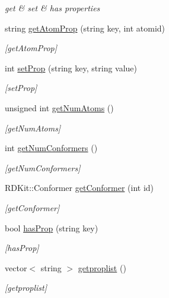 \begin{DoxyCompactItemize}
\begin{DoxyCompactList}\small\item\em get \& set \& has properties \end{DoxyCompactList}\item 
string \mbox{\hyperlink{class_molecule_acb057213561817b5e78a1e5e5845ae8f}{get\+Atom\+Prop}} (string key, int atomid)
\begin{DoxyCompactList}\small\item\em \mbox{[}get\+Atom\+Prop\mbox{]} \end{DoxyCompactList}\item 
int \mbox{\hyperlink{class_molecule_a25264008a24371142100f10ab7907d6f}{set\+Prop}} (string key, string value)
\begin{DoxyCompactList}\small\item\em \mbox{[}set\+Prop\mbox{]} \end{DoxyCompactList}\item 
unsigned int \mbox{\hyperlink{class_molecule_a23bfc1c88f4aff43e87af062fe295922}{get\+Num\+Atoms}} ()
\begin{DoxyCompactList}\small\item\em \mbox{[}get\+Num\+Atoms\mbox{]} \end{DoxyCompactList}\item 
int \mbox{\hyperlink{class_molecule_a00c23cd635ca82207165e59cdd714d99}{get\+Num\+Conformers}} ()
\begin{DoxyCompactList}\small\item\em \mbox{[}get\+Num\+Conformers\mbox{]} \end{DoxyCompactList}\item 
R\+D\+Kit\+::\+Conformer \mbox{\hyperlink{class_molecule_ad58d85938153a73ee5f17426474e6a90}{get\+Conformer}} (int id)
\begin{DoxyCompactList}\small\item\em \mbox{[}get\+Conformer\mbox{]} \end{DoxyCompactList}\item 
bool \mbox{\hyperlink{class_molecule_a7168f3faf1d150373c0b8728767d1d4b}{has\+Prop}} (string key)
\begin{DoxyCompactList}\small\item\em \mbox{[}has\+Prop\mbox{]} \end{DoxyCompactList}\item 
vector$<$ string $>$ \mbox{\hyperlink{class_molecule_a5296c86bec78924d64bc2a9472eb91d5}{getproplist}} ()
\begin{DoxyCompactList}\small\item\em \mbox{[}getproplist\mbox{]} \end{DoxyCompactList}\item 

\end{DoxyCompactItemize}
